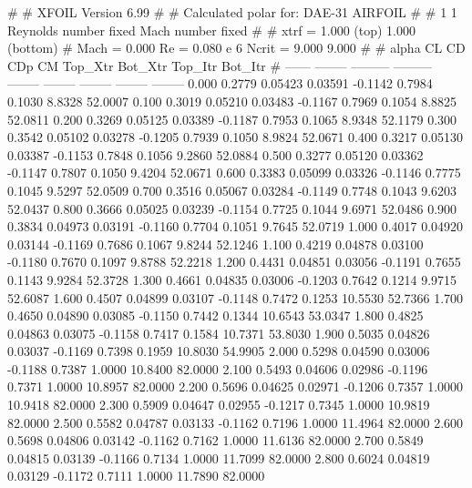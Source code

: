 #  
#       XFOIL         Version 6.99
#  
# Calculated polar for: DAE-31 AIRFOIL                                  
#  
# 1 1 Reynolds number fixed          Mach number fixed         
#  
# xtrf =   1.000 (top)        1.000 (bottom)  
# Mach =   0.000     Re =     0.080 e 6     Ncrit =   9.000  9.000
#  
#   alpha    CL        CD       CDp       CM     Top_Xtr  Bot_Xtr  Top_Itr  Bot_Itr
#  ------ -------- --------- --------- -------- -------- -------- -------- --------
   0.000   0.2779   0.05423   0.03591  -0.1142   0.7984   0.1030   8.8328  52.0007
   0.100   0.3019   0.05210   0.03483  -0.1167   0.7969   0.1054   8.8825  52.0811
   0.200   0.3269   0.05125   0.03389  -0.1187   0.7953   0.1065   8.9348  52.1179
   0.300   0.3542   0.05102   0.03278  -0.1205   0.7939   0.1050   8.9824  52.0671
   0.400   0.3217   0.05130   0.03387  -0.1153   0.7848   0.1056   9.2860  52.0884
   0.500   0.3277   0.05120   0.03362  -0.1147   0.7807   0.1050   9.4204  52.0671
   0.600   0.3383   0.05099   0.03326  -0.1146   0.7775   0.1045   9.5297  52.0509
   0.700   0.3516   0.05067   0.03284  -0.1149   0.7748   0.1043   9.6203  52.0437
   0.800   0.3666   0.05025   0.03239  -0.1154   0.7725   0.1044   9.6971  52.0486
   0.900   0.3834   0.04973   0.03191  -0.1160   0.7704   0.1051   9.7645  52.0719
   1.000   0.4017   0.04920   0.03144  -0.1169   0.7686   0.1067   9.8244  52.1246
   1.100   0.4219   0.04878   0.03100  -0.1180   0.7670   0.1097   9.8788  52.2218
   1.200   0.4431   0.04851   0.03056  -0.1191   0.7655   0.1143   9.9284  52.3728
   1.300   0.4661   0.04835   0.03006  -0.1203   0.7642   0.1214   9.9715  52.6087
   1.600   0.4507   0.04899   0.03107  -0.1148   0.7472   0.1253  10.5530  52.7366
   1.700   0.4650   0.04890   0.03085  -0.1150   0.7442   0.1344  10.6543  53.0347
   1.800   0.4825   0.04863   0.03075  -0.1158   0.7417   0.1584  10.7371  53.8030
   1.900   0.5035   0.04826   0.03037  -0.1169   0.7398   0.1959  10.8030  54.9905
   2.000   0.5298   0.04590   0.03006  -0.1188   0.7387   1.0000  10.8400  82.0000
   2.100   0.5493   0.04606   0.02986  -0.1196   0.7371   1.0000  10.8957  82.0000
   2.200   0.5696   0.04625   0.02971  -0.1206   0.7357   1.0000  10.9418  82.0000
   2.300   0.5909   0.04647   0.02955  -0.1217   0.7345   1.0000  10.9819  82.0000
   2.500   0.5582   0.04787   0.03133  -0.1162   0.7196   1.0000  11.4964  82.0000
   2.600   0.5698   0.04806   0.03142  -0.1162   0.7162   1.0000  11.6136  82.0000
   2.700   0.5849   0.04815   0.03139  -0.1166   0.7134   1.0000  11.7099  82.0000
   2.800   0.6024   0.04819   0.03129  -0.1172   0.7111   1.0000  11.7890  82.0000
